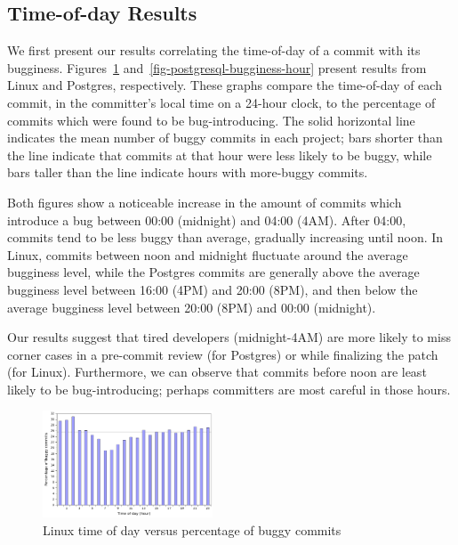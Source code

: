 
\subsection{Time-of-day Results} 
We first present our results correlating the time-of-day of a commit
with its bugginess.  Figures~\ref{fig-linux-bugginess-hour}
and~\ref{fig-postgresql-bugginess-hour} present results from Linux and
Postgres, respectively. These graphs compare the time-of-day of each
commit, in the committer's local time on a 24-hour clock, to the
percentage of commits which were found to be bug-introducing. The
solid horizontal line indicates the mean number of buggy commits in
each project; bars shorter than the line indicate that commits at that
hour were less likely to be buggy, while bars taller than the line
indicate hours with more-buggy commits.

Both figures show a noticeable increase in the amount of commits which
introduce a bug between 00:00 (midnight) and 04:00 (4AM). After 04:00,
commits tend to be less buggy than average, gradually increasing until
noon.  In Linux, commits between noon and midnight fluctuate around
the average bugginess level, while the Postgres commits are generally
above the average bugginess level between 16:00 (4PM) and 20:00 (8PM),
and then below the average bugginess level between 20:00 (8PM) and
00:00 (midnight).

Our results suggest that tired developers (midnight-4AM) are more
likely to miss corner cases in a pre-commit review (for Postgres) or
while finalizing the patch (for Linux). Furthermore, we can observe
that commits before noon are least likely to be bug-introducing;
perhaps committers are most careful in those hours.

\begin{figure}
\begin{center}
\includegraphics[width=0.45\textwidth]{linux-bugginess-hour.pdf}
\end{center}
\caption{Linux time of day versus percentage of buggy commits}
\label{fig-linux-bugginess-hour}
\end{figure}

